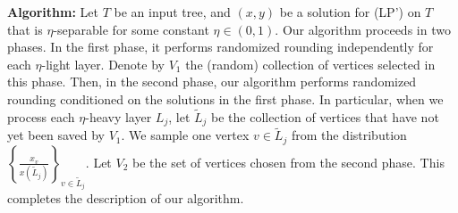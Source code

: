 \textbf{Algorithm:}
Let $T$ be an input tree, and $(x,y)$ be a solution for (LP') on $T$ that is $\eta$-separable for some constant $\eta \in (0,1)$.
Our algorithm proceeds in two phases.  
In the first phase, it performs
randomized rounding independently for each $\eta$-light layer.
Denote by $V_1$ the (random) collection of vertices selected in this phase. 
Then,
in the second phase, our algorithm performs randomized rounding conditioned on the solutions in
the first phase. 
In particular, when we process each $\eta$-heavy layer $L_j$, let $\tilde L_j$ be the collection of vertices that have not yet been saved by $V_1$.
We sample one vertex $v \in \tilde L_j$ from the distribution $\left\{\frac{x_v}{x(\tilde L_j)}\right\}_{v \in \tilde L_j}$. 
Let $V_2$ be the set of vertices chosen from the second phase. 
This completes the description of our algorithm. 
